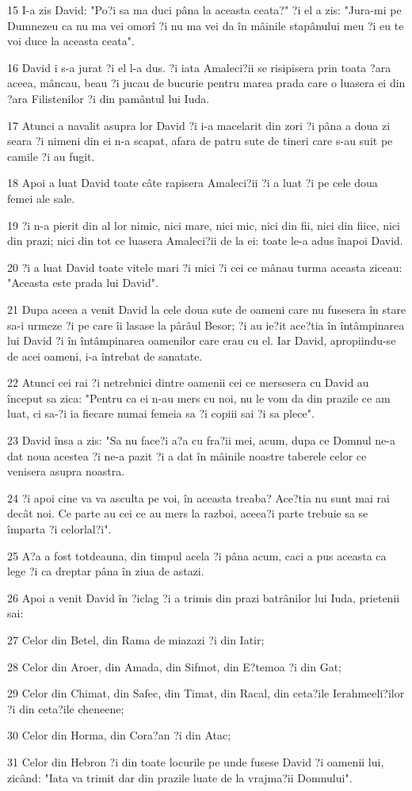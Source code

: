 \par 15 I-a zis David: "Po?i sa ma duci pâna la aceasta ceata?" ?i el a zis: "Jura-mi pe Dumnezeu ca nu ma vei omorî ?i nu ma vei da în mâinile stapânului meu ?i eu te voi duce la aceasta ceata".
\par 16 David i s-a jurat ?i el l-a dus. ?i iata Amaleci?ii se risipisera prin toata ?ara aceea, mâncau, beau ?i jucau de bucurie pentru marea prada care o luasera ei din ?ara Filistenilor ?i din pamântul lui Iuda.
\par 17 Atunci a navalit asupra lor David ?i i-a macelarit din zori ?i pâna a doua zi seara ?i nimeni din ei n-a scapat, afara de patru sute de tineri care s-au suit pe camile ?i au fugit.
\par 18 Apoi a luat David toate câte rapisera Amaleci?ii ?i a luat ?i pe cele doua femei ale sale.
\par 19 ?i n-a pierit din al lor nimic, nici mare, nici mic, nici din fii, nici din fiice, nici din prazi; nici din tot ce luasera Amaleci?ii de la ei: toate le-a adus înapoi David.
\par 20 ?i a luat David toate vitele mari ?i mici ?i cei ce mânau turma aceasta ziceau: "Aceasta este prada lui David".
\par 21 Dupa aceea a venit David la cele doua sute de oameni care nu fusesera în stare sa-i urmeze ?i pe care îi lasase la pârâul Besor; ?i au ie?it ace?tia în întâmpinarea lui David ?i în întâmpinarea oamenilor care erau cu el. Iar David, apropiindu-se de acei oameni, i-a întrebat de sanatate.
\par 22 Atunci cei rai ?i netrebnici dintre oamenii cei ce mersesera cu David au început sa zica: "Pentru ca ei n-au mers cu noi, nu le vom da din prazile ce am luat, ci sa-?i ia fiecare numai femeia sa ?i copiii sai ?i sa plece".
\par 23 David însa a zis: "Sa nu face?i a?a cu fra?ii mei, acum, dupa ce Domnul ne-a dat noua acestea ?i ne-a pazit ?i a dat în mâinile noastre taberele celor ce venisera asupra noastra.
\par 24 ?i apoi cine va va asculta pe voi, în aceasta treaba? Ace?tia nu sunt mai rai decât noi. Ce parte au cei ce au mers la razboi, aceea?i parte trebuie sa se împarta ?i celorlal?i".
\par 25 A?a a fost totdeauna, din timpul acela ?i pâna acum, caci a pus aceasta ca lege ?i ca dreptar pâna în ziua de astazi.
\par 26 Apoi a venit David în ?iclag ?i a trimis din prazi batrânilor lui Iuda, prietenii sai:
\par 27 Celor din Betel, din Rama de miazazi ?i din Iatir;
\par 28 Celor din Aroer, din Amada, din Sifmot, din E?temoa ?i din Gat;
\par 29 Celor din Chimat, din Safec, din Timat, din Racal, din ceta?ile Ierahmeeli?ilor ?i din ceta?ile cheneene;
\par 30 Celor din Horma, din Cora?an ?i din Atac;
\par 31 Celor din Hebron ?i din toate locurile pe unde fusese David ?i oamenii lui, zicând: "Iata va trimit dar din prazile luate de la vrajma?ii Domnului".

